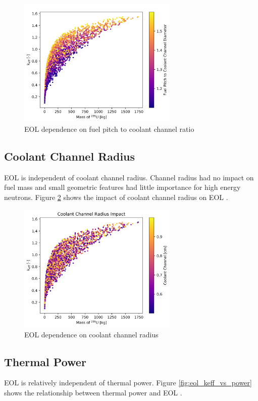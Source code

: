 \begin{figure}[h]
    \centering
    \includegraphics[width=3in]{../images/keff_vs_mass_235_PD.png}
\caption{EOL \keff dependence on fuel pitch to coolant channel ratio}
\label{fig:eol_keff_vs_PD_mass}
\end{figure}

\subsection{Coolant Channel Radius}
EOL \keff is independent of coolant channel radius. Channel radius had no impact
on fuel mass and small geometric features had little importance for high 
energy neutrons. Figure \ref{fig:eol_keff_vs_r_cool} shows the impact of 
coolant channel radius on EOL \keff.

\begin{figure}[h]
    \centering
    \includegraphics[width=3in]{../images/keff_vs_cool_r.png}
\caption{EOL \keff dependence on coolant channel radius}
\label{fig:eol_keff_vs_r_cool}
\end{figure}

\subsection{Thermal Power}
EOL \keff is relatively independent of thermal power.
Figure \ref{fig:eol_keff_vs_power} shows the relationship between thermal power
and EOL \keff.

